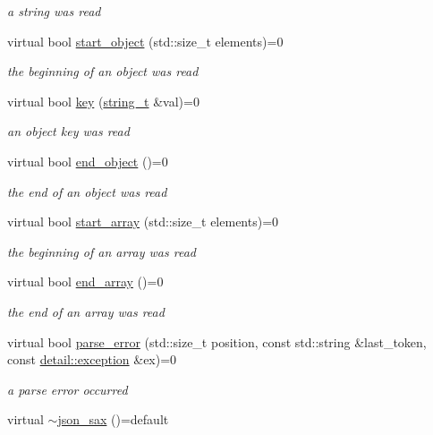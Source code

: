 \begin{DoxyCompactItemize}
\begin{DoxyCompactList}\small\item\em a string was read \end{DoxyCompactList}\item 
virtual bool \hyperlink{structnlohmann_1_1json__sax_a0671528b0debb5a348169d61f0382a0f}{start\+\_\+object} (std\+::size\+\_\+t elements)=0
\begin{DoxyCompactList}\small\item\em the beginning of an object was read \end{DoxyCompactList}\item 
virtual bool \hyperlink{structnlohmann_1_1json__sax_a2e0c7ecd80b18d18a8cc76f71cfc2028}{key} (\hyperlink{structnlohmann_1_1json__sax_ae01977a9f3c5b3667b7a2929ed91061e}{string\+\_\+t} \&val)=0
\begin{DoxyCompactList}\small\item\em an object key was read \end{DoxyCompactList}\item 
virtual bool \hyperlink{structnlohmann_1_1json__sax_ad0c722d53ff97be700ccf6a9468bd456}{end\+\_\+object} ()=0
\begin{DoxyCompactList}\small\item\em the end of an object was read \end{DoxyCompactList}\item 
virtual bool \hyperlink{structnlohmann_1_1json__sax_a5c53878cf08d463eb4e7ca0270532572}{start\+\_\+array} (std\+::size\+\_\+t elements)=0
\begin{DoxyCompactList}\small\item\em the beginning of an array was read \end{DoxyCompactList}\item 
virtual bool \hyperlink{structnlohmann_1_1json__sax_a235ee975617f28e6a996d1e36a282312}{end\+\_\+array} ()=0
\begin{DoxyCompactList}\small\item\em the end of an array was read \end{DoxyCompactList}\item 
virtual bool \hyperlink{structnlohmann_1_1json__sax_a60287e3bd85f489e04c83f7e3b76e613}{parse\+\_\+error} (std\+::size\+\_\+t position, const std\+::string \&last\+\_\+token, const \hyperlink{classnlohmann_1_1detail_1_1exception}{detail\+::exception} \&ex)=0
\begin{DoxyCompactList}\small\item\em a parse error occurred \end{DoxyCompactList}\item 
virtual \hyperlink{structnlohmann_1_1json__sax_af31bacfa81aa7818d8639d1da65c8eb5}{$\sim$json\+\_\+sax} ()=default
\end{DoxyCompactItemize}


